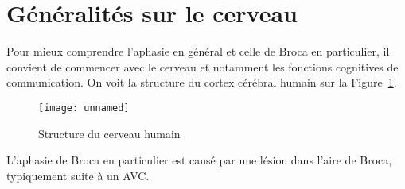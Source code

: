 \section{Généralités sur le cerveau}

Pour mieux comprendre l'aphasie en général et celle de Broca en particulier, 
il convient de commencer avec le cerveau et notamment les fonctions cognitives de communication. On voit la structure du cortex cérébral humain sur la Figure~\ref{fig:human-brain}.

\begin{figure}
    \begin{center}
        \texttt{[image: unnamed]}
    \end{center}
    \caption{Structure du cerveau humain}
    \label{fig:human-brain}
\end{figure}

L'aphasie de Broca en particulier est causé par une lésion dans l'aire de Broca, typiquement suite à un AVC.